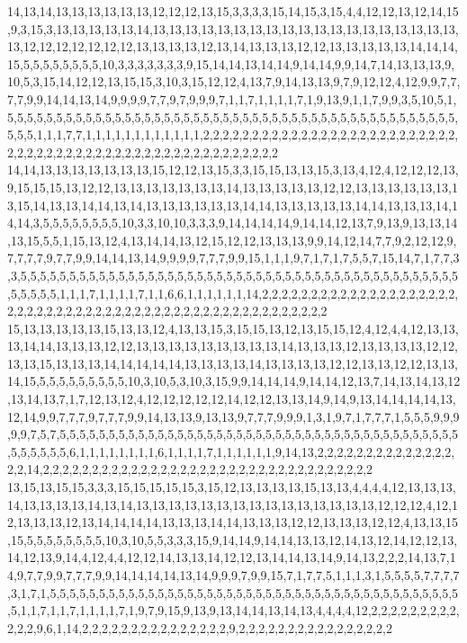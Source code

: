 14,13,14,13,13,13,13,13,13,12,12,12,13,15,3,3,3,3,15,14,15,3,15,4,4,12,12,13,12,14,15,9,3,15,3,13,13,13,13,13,14,13,13,13,13,13,13,13,13,13,13,13,13,13,13,13,13,13,13,13,13,12,12,12,12,12,12,12,13,13,13,13,12,13,14,13,13,13,12,12,13,13,13,13,13,14,14,14,15,5,5,5,5,5,5,5,5,10,3,3,3,3,3,3,3,9,15,14,14,13,14,14,9,14,14,9,9,14,7,14,13,13,13,9,10,5,3,15,14,12,12,13,15,15,3,10,3,15,12,12,4,13,7,9,14,13,13,9,7,9,12,12,4,12,9,9,7,7,7,7,9,9,14,14,13,14,9,9,9,9,7,7,9,7,9,9,9,7,1,1,7,1,1,1,1,7,1,9,13,9,1,1,7,9,9,3,5,10,5,1,5,5,5,5,5,5,5,5,5,5,5,5,5,5,5,5,5,5,5,5,5,5,5,5,5,5,5,5,5,5,5,5,5,5,5,5,5,5,5,5,5,5,5,5,5,5,5,5,5,1,1,1,7,7,1,1,1,1,1,1,1,1,1,1,1,1,2,2,2,2,2,2,2,2,2,2,2,2,2,2,2,2,2,2,2,2,2,2,2,2,2,2,2,2,2,2,2,2,2,2,2,2,2,2,2,2,2,2,2,2,2,2,2,2,2,2,2,2,2,2
14,14,13,13,13,13,13,13,13,15,12,12,13,15,3,3,15,15,13,13,15,3,13,4,12,4,12,12,12,13,9,15,15,15,13,12,12,13,13,13,13,13,13,13,14,13,13,13,13,13,12,12,13,13,13,13,13,13,13,15,14,13,13,14,14,13,14,13,13,13,13,13,13,14,14,13,13,13,13,13,14,14,13,13,13,14,14,14,3,5,5,5,5,5,5,5,5,10,3,3,10,10,3,3,3,9,14,14,14,14,9,14,14,12,13,7,9,13,9,13,13,14,13,15,5,5,1,15,13,12,4,13,14,14,13,12,15,12,12,13,13,13,9,9,14,12,14,7,7,9,2,12,12,9,7,7,7,7,9,7,7,9,9,14,14,13,14,9,9,9,9,7,7,7,9,9,15,1,1,1,9,7,1,7,1,7,5,5,7,15,14,7,1,7,7,3,3,5,5,5,5,5,5,5,5,5,5,5,5,5,5,5,5,5,5,5,5,5,5,5,5,5,5,5,5,5,5,5,5,5,5,5,5,5,5,5,5,5,5,5,5,5,5,5,5,5,5,1,1,1,7,1,1,1,1,7,1,1,6,6,1,1,1,1,1,1,14,2,2,2,2,2,2,2,2,2,2,2,2,2,2,2,2,2,2,2,2,2,2,2,2,2,2,2,2,2,2,2,2,2,2,2,2,2,2,2,2,2,2,2,2,2,2,2,2,2,2,2,2,2
15,13,13,13,13,13,15,13,13,12,4,13,13,15,3,15,15,13,12,13,15,15,12,4,12,4,4,12,13,13,13,14,14,13,13,13,12,12,13,13,13,13,13,13,13,13,13,14,13,13,13,12,13,13,13,13,12,12,13,13,15,13,13,13,14,14,14,14,14,13,13,13,13,14,13,13,13,13,12,12,13,13,12,12,13,13,14,15,5,5,5,5,5,5,5,5,5,10,3,10,5,3,10,3,15,9,9,14,14,14,9,14,14,12,13,7,14,13,14,13,12,13,14,13,7,1,7,12,13,12,4,12,12,12,12,12,14,12,12,13,13,14,9,14,9,13,14,14,14,14,13,12,14,9,9,7,7,7,9,7,7,7,9,9,14,13,13,9,13,13,9,7,7,7,9,9,9,1,3,1,9,7,1,7,7,7,1,5,5,5,9,9,9,9,9,7,5,7,5,5,5,5,5,5,5,5,5,5,5,5,5,5,5,5,5,5,5,5,5,5,5,5,5,5,5,5,5,5,5,5,5,5,5,5,5,5,5,5,5,5,5,5,5,5,5,6,1,1,1,1,1,1,1,1,6,1,1,1,1,7,1,1,1,1,1,1,9,14,13,2,2,2,2,2,2,2,2,2,2,2,2,2,2,2,2,14,2,2,2,2,2,2,2,2,2,2,2,2,2,2,2,2,2,2,2,2,2,2,2,2,2,2,2,2,2,2,2,2,2,2
13,15,13,15,15,3,3,3,15,15,15,15,15,3,15,12,13,13,13,13,15,13,13,4,4,4,4,12,13,13,13,14,13,13,13,13,14,13,14,13,13,13,13,13,13,13,13,13,13,13,13,13,13,13,12,12,12,4,12,12,13,13,13,12,13,14,14,14,14,13,13,13,14,14,13,13,13,12,12,13,13,13,12,12,4,13,13,15,15,5,5,5,5,5,5,5,5,10,3,10,5,5,3,3,3,15,9,14,14,9,14,14,13,13,12,14,13,12,14,12,12,13,14,12,13,9,14,4,12,4,4,12,12,14,13,13,14,12,12,13,14,14,13,14,9,14,13,2,2,2,14,13,7,14,9,7,7,9,9,7,7,7,9,9,14,14,14,14,13,14,9,9,9,7,9,9,15,7,1,7,7,5,1,1,1,3,1,5,5,5,5,7,7,7,7,3,1,7,1,5,5,5,5,5,5,5,5,5,5,5,5,5,5,5,5,5,5,5,5,5,5,5,5,5,5,5,5,5,5,5,5,5,5,5,5,5,5,5,5,5,5,5,1,1,7,1,1,7,1,1,1,1,7,1,9,7,9,15,9,13,9,13,14,14,13,14,13,4,4,4,4,12,2,2,2,2,2,2,2,2,2,2,2,2,9,6,1,14,2,2,2,2,2,2,2,2,2,2,2,2,2,2,2,9,2,2,2,2,2,2,2,2,2,2,2,2,2,2,2,2

